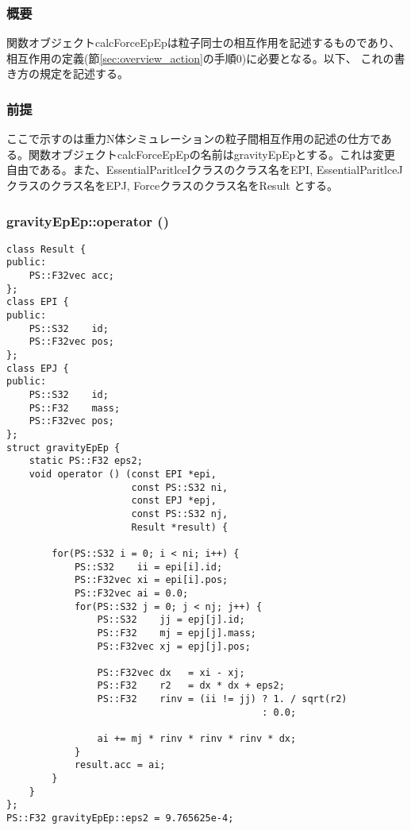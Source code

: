 \subsubsection{概要}

関数オブジェクトcalcForceEpEpは粒子同士の相互作用を記述するものであり、
相互作用の定義(節\ref{sec:overview_action}の手順0)に必要となる。以下、
これの書き方の規定を記述する。

\subsubsection{前提}

ここで示すのは重力N体シミュレーションの粒子間相互作用の記述の仕方であ
る。関数オブジェクトcalcForceEpEpの名前はgravityEpEpとする。これは変更
自由である。また、EssentialParitlceIクラスのクラス名をEPI,
EssentialParitlceJクラスのクラス名をEPJ, Forceクラスのクラス名をResult
とする。

\subsubsection{gravityEpEp::operator ()}

\begin{lstlisting}[caption=calcForceEpEp]
class Result {
public:
    PS::F32vec acc;
};
class EPI {
public:
    PS::S32    id;
    PS::F32vec pos;
};
class EPJ {
public:
    PS::S32    id;
    PS::F32    mass;
    PS::F32vec pos;
};
struct gravityEpEp {
    static PS::F32 eps2;
    void operator () (const EPI *epi,
                      const PS::S32 ni,
                      const EPJ *epj,
                      const PS::S32 nj,
                      Result *result) {

        for(PS::S32 i = 0; i < ni; i++) {
            PS::S32    ii = epi[i].id;
            PS::F32vec xi = epi[i].pos;
            PS::F32vec ai = 0.0;
            for(PS::S32 j = 0; j < nj; j++) {
                PS::S32    jj = epj[j].id;
                PS::F32    mj = epj[j].mass;
                PS::F32vec xj = epj[j].pos;

                PS::F32vec dx   = xi - xj;
                PS::F32    r2   = dx * dx + eps2;
                PS::F32    rinv = (ii != jj) ? 1. / sqrt(r2)
                                             : 0.0;

                ai += mj * rinv * rinv * rinv * dx;
            }
            result.acc = ai;
        }
    }
};
PS::F32 gravityEpEp::eps2 = 9.765625e-4;
\end{lstlisting}

